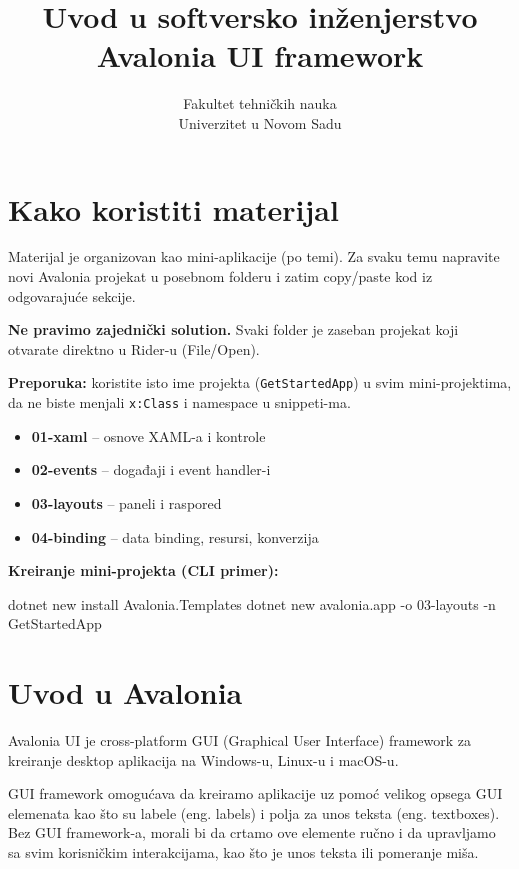 \documentclass[11pt,a4paper]{article}
\title{Uvod u softversko inženjerstvo\\Avalonia UI framework}
\author{Fakultet tehničkih nauka\\Univerzitet u Novom Sadu}
\date{}
\begin{document}
\maketitle

\section*{Kako koristiti materijal}
Materijal je organizovan kao mini-aplikacije (po temi). Za svaku temu napravite novi Avalonia projekat u posebnom folderu i zatim copy/paste kod iz odgovarajuće sekcije.

\textbf{Ne pravimo zajednički solution.} Svaki folder je zaseban projekat koji otvarate direktno u Rider-u (File/Open).

\textbf{Preporuka:} koristite isto ime projekta (\texttt{GetStartedApp}) u svim mini-projektima, da ne biste menjali \texttt{x:Class} i namespace u snippeti-ma.

\begin{itemize}[leftmargin=*]
  \item \textbf{01-xaml} -- osnove XAML-a i kontrole
  \item \textbf{02-events} -- događaji i event handler-i
  \item \textbf{03-layouts} -- paneli i raspored
  \item \textbf{04-binding} -- data binding, resursi, konverzija
\end{itemize}

\textbf{Kreiranje mini-projekta (CLI primer):}

\begin{CodeBlock}
dotnet new install Avalonia.Templates
dotnet new avalonia.app -o 03-layouts -n GetStartedApp
\end{CodeBlock}

\tableofcontents
\newpage

\section{Uvod u Avalonia}

Avalonia UI je cross-platform GUI (Graphical User Interface) framework za kreiranje desktop aplikacija na Windows-u, Linux-u i macOS-u.

GUI framework omogućava da kreiramo aplikacije uz pomoć velikog opsega GUI elemenata kao što su labele (eng. labels) i polja za unos teksta (eng. textboxes). Bez GUI framework-a, morali bi da crtamo ove elemente ručno i da upravljamo sa svim korisničkim interakcijama, kao što je unos teksta ili pomeranje miša.
\end{document}
